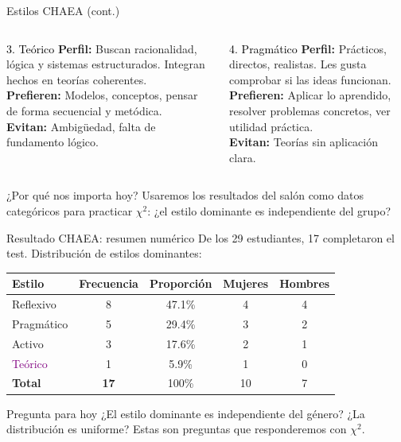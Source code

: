 \documentclass[aspectratio=169, 11pt]{beamer}
\begin{document}
\begin{frame}{Estilos CHAEA (cont.)}
\small
\begin{columns}[T]
\begin{block}{\textcolor{black}{3. Teórico}}
\footnotesize
\textbf{Perfil:} Buscan racionalidad, lógica y sistemas estructurados. Integran hechos en teorías coherentes.\\[2pt]
\textbf{Prefieren:} Modelos, conceptos, pensar de forma secuencial y metódica.\\[2pt]
\textbf{Evitan:} Ambigüedad, falta de fundamento lógico.
\end{block}

\begin{block}{\textcolor{black}{4. Pragmático}}
\footnotesize
\textbf{Perfil:} Prácticos, directos, realistas. Les gusta comprobar si las ideas funcionan.\\[2pt]
\textbf{Prefieren:} Aplicar lo aprendido, resolver problemas concretos, ver utilidad práctica.\\[2pt]
\textbf{Evitan:} Teorías sin aplicación clara.
\end{block}
\end{columns}

\vspace{0.3cm}
\begin{alertblock}{¿Por qué nos importa hoy?}
\small Usaremos los resultados del salón como datos categóricos para practicar $\chi^2$: ¿el estilo dominante es independiente del grupo?
\end{alertblock}
\end{frame}

\begin{frame}{Resultado CHAEA: resumen numérico}
\small
De los 29 estudiantes, 17 completaron el test. Distribución de estilos dominantes:

\vspace{0.2cm}
\begin{center}
\begin{tabular}{lcccc}
\toprule
\textbf{Estilo} & \textbf{Frecuencia} & \textbf{Proporción} & \textbf{Mujeres} & \textbf{Hombres} \\
\midrule
\textcolor{green!50!black}{Reflexivo} & 8 & 47.1\% & 4 & 4 \\
\textcolor{orange!80!black}{Pragmático} & 5 & 29.4\% & 3 & 2 \\
\textcolor{blue!70}{Activo} & 3 & 17.6\% & 2 & 1 \\
\textcolor{purple}{Teórico} & 1 & 5.9\% & 1 & 0 \\
\midrule
\textbf{Total} & \textbf{17} & 100\% & 10 & 7 \\
\bottomrule
\end{tabular}
\end{center}

\vspace{0.2cm}
\begin{alertblock}{Pregunta para hoy}
¿El estilo dominante es independiente del género? ¿La distribución es uniforme? Estas son preguntas que responderemos con $\chi^2$.
\end{alertblock}
\end{frame}
\end{document}
